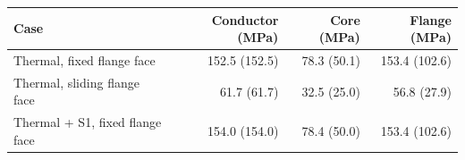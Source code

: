 \begin{tabular}{lrrr}
\toprule
Case & Conductor (MPa) & Core (MPa) & Flange (MPa) \\
\midrule
Thermal, fixed flange face & 152.5 (152.5) & 78.3 (50.1) & 153.4 (102.6) \\
Thermal, sliding flange face & 61.7 (61.7) & 32.5 (25.0) & 56.8 (27.9) \\
Thermal + S1, fixed flange face & 154.0 (154.0) & 78.4 (50.0) & 153.4 (102.6) \\
\bottomrule
\end{tabular}
